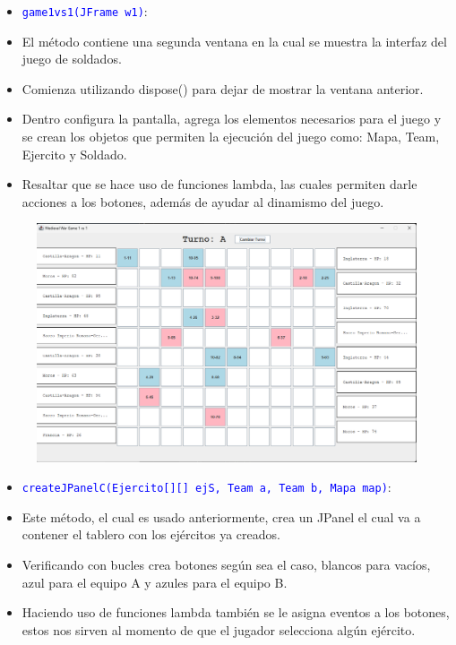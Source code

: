 \documentclass{article}
\begin{document}

\begin{itemize}
    \item \texttt{\textcolor{blue}{game1vs1(JFrame w1)}}: 
    \item El método contiene una segunda ventana en la cual se muestra la interfaz del juego de soldados.
    \item Comienza utilizando dispose() para dejar de mostrar la ventana anterior.
    \item Dentro configura la pantalla, agrega los elementos necesarios para el juego y se crean los objetos que permiten la ejecución del juego como: Mapa, Team, Ejercito y Soldado.
    \item Resaltar que se hace uso de funciones lambda, las cuales permiten darle acciones a los botones, además de ayudar al dinamismo del juego.
\end{itemize}
\begin{figure}[H]
    \centering
    \includegraphics[width=1\textwidth,keepaspectratio]{img/vj2.png}
    \caption{}
\end{figure}

\newpage
\begin{itemize}
    \item \texttt{\textcolor{blue}{createJPanelC(Ejercito[][] ejS, Team a, Team b, Mapa map)}}: 
    \item Este método, el cual es usado anteriormente, crea un JPanel el cual va a contener el tablero con los ejércitos ya creados.
    \item Verificando con bucles crea botones según sea el caso, blancos para vacíos, azul para el equipo A y azules para el equipo B.
    \item Haciendo uso de funciones lambda también se le asigna eventos a los botones, estos nos sirven al momento de que el jugador selecciona algún ejército.
\end{itemize}
\end{document}
